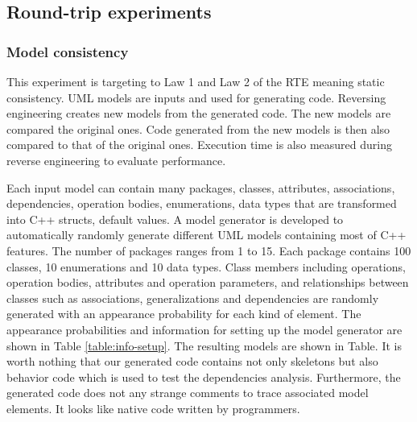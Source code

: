 \subsection{Round-trip experiments}
\subsubsection{Model consistency}
This experiment is targeting to Law 1 and Law 2 of the RTE meaning static consistency. UML models are inputs and used for generating code. Reversing engineering creates new models from the generated code. The new models are compared the original ones. Code generated from the new models is then also compared to that of the original ones. Execution time is also measured during reverse engineering to evaluate performance.

Each input model can contain many packages, classes, attributes, associations, dependencies, operation bodies, enumerations, data types that are transformed into C++ structs, default values. A model generator is developed to automatically randomly generate different UML models containing most of C++ features. The number of packages ranges from 1 to 15. Each package contains 100 classes, 10 enumerations and 10 data types. Class members including operations, operation bodies, attributes and operation parameters, and relationships between classes such as associations, generalizations and dependencies are randomly generated with an appearance probability for each kind of element. The appearance probabilities and information for setting up the model generator are shown in Table \ref{table:info-setup}. The resulting models are shown in Table. It is worth nothing that our generated code contains not only skeletons but also behavior code which is used to test the dependencies analysis. Furthermore, the generated code does not any strange comments to trace associated model elements. It looks like native code written by programmers.  

